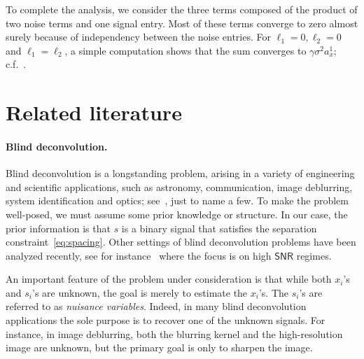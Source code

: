 \documentclass[english,11pt]{article}
\numberwithin{equation}{section}
\theoremstyle{plain}
\theoremstyle{definition}
\theoremstyle{remark}
\theoremstyle{plain}
\theoremstyle{remark}
\theoremstyle{plain}
\theoremstyle{plain}
\newcommand{\SNR}{{\textsf{SNR}}}
\begin{document}
To complete the analysis, we consider the three terms composed of the product of two noise terms and one signal entry. Most of these terms converge to zero almost surely because of independency between the noise entries. For $\ell_1=0, \ell_2=0$ and $\ell_1=\ell_2$,  a simple computation shows that the sum converges to $\gamma\sigma^2a_x^1$; c.f.~\cite{boumal2017heterogeneous}.


\section{Related literature} \label{sec:related_literature}

\paragraph{Blind deconvolution.}
Blind deconvolution is a longstanding problem, arising in a variety of engineering and scientific applications, such as astronomy, communication, image deblurring, system identification and optics; see~\cite{jefferies1993restoration,shalvi1990new,ayers1988iterative,abed1997blind}, just to name a few. 
To make the problem well-posed, we must  assume some prior knowledge or  structure. 
In our case, the prior information is that $s$ is a binary signal that satisfies the separation constraint~\eqref{eq:spacing}. 
Other settings of blind deconvolution problems have been analyzed recently, see for instance~\cite{ahmed2014blind,li2016identifiability,li2016rapid,ling2015self,ling2017blind,chi2016guaranteed}
where the focus is on high $\SNR$ regimes.


An important feature of the problem under consideration is that while both $x_i$'s and $s_i$'s are unknown, the goal is merely to estimate the $x_i$'s. The  $s_i$'s  are referred to as \emph{nuisance  variables}. Indeed, in many blind deconvolution applications the sole purpose is to recover one of the unknown signals. For instance, in image deblurring, both the blurring
kernel and the high-resolution image are unknown, but the primary goal is only
to sharpen the image.
\end{document}
